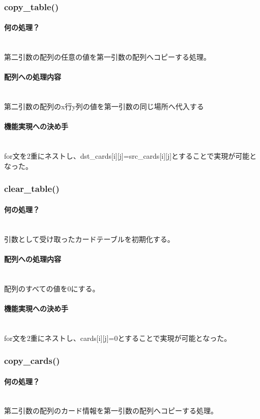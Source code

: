 \documentclass[11pt,a4paper, uplatex]{jsarticle}
\begin{document}
\subsubsection{copy\_table()}
\paragraph{何の処理？}\mbox{}\\
第二引数の配列の任意の値を第一引数の配列へコピーする処理。
\paragraph{配列への処理内容}\mbox{}\\
第二引数の配列のx行y列の値を第一引数の同じ場所へ代入する
\paragraph{機能実現への決め手}\mbox{}\\
for文を2重にネストし、dst\_cards[i][j]=src\_cards[i][j]とすることで実現が可能となった。
%
\subsubsection{clear\_table()}
\paragraph{何の処理？}\mbox{}\\
引数として受け取ったカードテーブルを初期化する。
\paragraph{配列への処理内容}\mbox{}\\
配列のすべての値を0にする。
\paragraph{機能実現への決め手}\mbox{}\\
for文を2重にネストし、cards[i][j]=0とすることで実現が可能となった。
%
\subsubsection{copy\_cards()}
\paragraph{何の処理？}\mbox{}\\
第二引数の配列のカード情報を第一引数の配列へコピーする処理。
\end{document}
